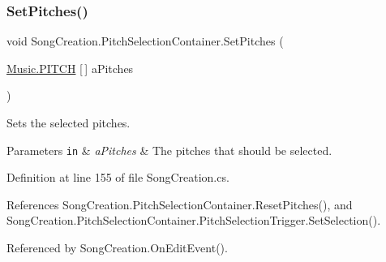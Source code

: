 \subsubsection{\texorpdfstring{Set\+Pitches()}{SetPitches()}}
{\footnotesize\ttfamily void Song\+Creation.\+Pitch\+Selection\+Container.\+Set\+Pitches (\begin{DoxyParamCaption}\item[{\hyperlink{group___music_enums_ga508f69b199ea518f935486c990edac1d}{Music.\+P\+I\+T\+CH} \mbox{[}$\,$\mbox{]}}]{a\+Pitches }\end{DoxyParamCaption})}



Sets the selected pitches. 


\begin{DoxyParams}[1]{Parameters}
\mbox{\tt in}  & {\em a\+Pitches} & The pitches that should be selected. \\
\hline
\end{DoxyParams}


Definition at line 155 of file Song\+Creation.\+cs.



References Song\+Creation.\+Pitch\+Selection\+Container.\+Reset\+Pitches(), and Song\+Creation.\+Pitch\+Selection\+Container.\+Pitch\+Selection\+Trigger.\+Set\+Selection().



Referenced by Song\+Creation.\+On\+Edit\+Event().


